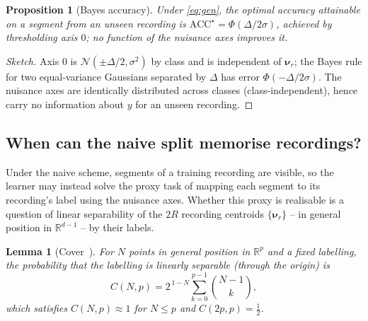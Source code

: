 \documentclass[11pt]{article}
\newtheorem{proposition}{Proposition}
\newtheorem{lemma}{Lemma}
\begin{document}
\begin{proposition}[Bayes accuracy]
\label{prop:bayes}
Under \eqref{eq:gen}, the optimal accuracy attainable on a segment from an unseen recording is $\mathrm{ACC}^\star=\Phi(\Delta/2\sigma)$, achieved by thresholding axis $0$; no function of the nuisance axes improves it.
\end{proposition}
\begin{proof}[Sketch]
Axis $0$ is $\mathcal{N}(\pm\Delta/2,\sigma^2)$ by class and is independent of $\boldsymbol{\nu}_r$; the Bayes rule for two equal-variance Gaussians separated by $\Delta$ has error $\Phi(-\Delta/2\sigma)$. The nuisance axes are identically distributed across classes (class-independent), hence carry no information about $y$ for an unseen recording.
\end{proof}

\subsection{When can the naive split memorise recordings?}
Under the naive scheme, segments of a training recording are visible, so the learner may instead solve the proxy task of mapping each segment to its recording's label using the nuisance axes. Whether this proxy is realisable is a question of linear separability of the $2R$ recording centroids $\{\boldsymbol{\nu}_r\}$ -- in general position in $\mathbb{R}^{d-1}$ -- by their labels.

\begin{lemma}[Cover~\cite{cover}]
\label{lem:cover}
For $N$ points in general position in $\mathbb{R}^{p}$ and a fixed labelling, the probability that the labelling is linearly separable (through the origin) is
\begin{equation}
C(N,p)=2^{\,1-N}\sum_{k=0}^{p-1}\binom{N-1}{k},
\end{equation}
which satisfies $C(N,p)\approx 1$ for $N\le p$ and $C(2p,p)=\tfrac12$.
\end{lemma}
\end{document}
